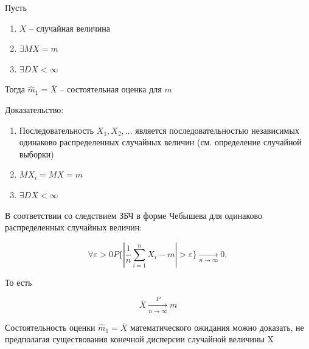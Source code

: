 \begin{example}
    Пусть

    \begin{enumerate}
        \item $X$ -- случайная величина
        \item $\exists MX = m$
        \item $\exists DX < \infty$
    \end{enumerate}

    Тогда $\hat m_1 = \overline{X}$ -- состоятельная оценка для $m$

    Доказательство:
    \begin{enumerate}
        \item Последовательность $X_1, X_2,...$ является
            последовательностью независимых одинаково распределенных
            случайных величин (см. определение случайной выборки)
        \item $MX_i = MX = m$
        \item $\exists DX < \infty$
    \end{enumerate}

    В соответствии со следствием ЗБЧ в форме Чебышева для одинаково
    распределенных случайных величин:

    \begin{equation*}
        \forall \varepsilon > 0 P\{ | \frac{1}{n} \sum_{i=1}^n X_i -
        m | > \varepsilon \} \xrightarrow[n \to \infty]{} 0,
    \end{equation*}

    То есть

    \begin{equation*}
        \overline{X} \xrightarrow[n \to \infty]{P} m
    \end{equation*}
\end{example}

\begin{note}
    Состоятельность оценки $\hat m_1 = \overline X$ математического
    ожидания можно доказать, не предполагая существования конечной
    дисперсии случайной величины X
\end{note}

